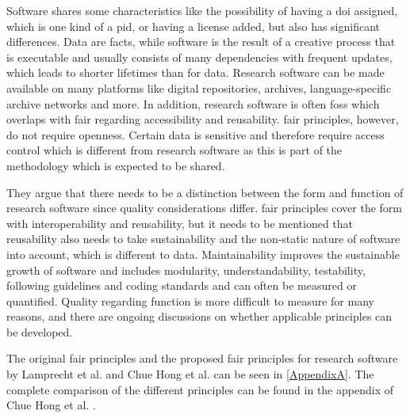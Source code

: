 Software shares some characteristics like the possibility of having a \acrfull{doi} assigned, which is one kind of a \acrshort{pid}, or having a license added, but also has significant differences. Data are facts, while software is the result of a creative process that is executable and usually consists of many dependencies with frequent updates, which leads to shorter lifetimes than for data. Research software can be made available on many platforms like digital repositories, archives, language-specific archive networks and more. 
In addition, research software is often \acrshort{foss} which overlaps with \acrshort{fair} regarding accessibility and reusability. \acrshort{fair} principles, however, do not require openness. Certain data is sensitive and therefore require access control which is different from research software as this is part of the methodology which is expected to be shared.

They argue that there needs to be a distinction between the form and function of research software since quality considerations differ. \acrshort{fair} principles cover the form with interoperability and reusability, but it needs to be mentioned that reusability also needs to take sustainability and the non-static nature of software into account, which is different to data. Maintainability improves the sustainable growth of software and includes modularity, understandability, testability, following guidelines and coding standards and can often be measured or quantified. Quality regarding function is more difficult to measure for many reasons, and there are ongoing discussions on whether applicable principles can be developed.

The original \acrshort{fair} principles and the proposed \acrshort{fair} principles for research software by Lamprecht et al. and Chue Hong et al. \cite{chue_hong_fair_2022} can be seen in \autoref{AppendixA}. The complete comparison of the different principles can be found in the appendix of Chue Hong et al. \cite{chue_hong_fair_2022}. 

